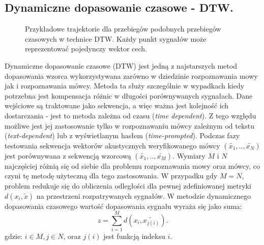 \subsection{Dynamiczne dopasowanie czasowe - DTW.}

\begin{figure}
  \centering
    
    \caption{Przykładowe trajektorie  dla przebiegów podobnych przebiegów czasowych w technice DTW. Każdy punkt sygnałów może reprezentować pojedynczy wektor cech.}
    \label{dtw}
\end{figure}

Dynamiczne dopasowanie czasowe (DTW) jest jedną z najstarszych metod dopasowania wzorca \cite{multidsp} wykorzystywana zarówno w dziedzinie rozpoznawania mowy jak i rozpoznawania mówcy. Metoda ta służy szczególnie w wypadkach kiedy potrzebna jest kompensacja różnic w długości porównywanych sygnałach. Dane wejściowe są traktowane jako sekwencja, a więc ważna jest kolejność ich dostarczania - jest to metoda zależna od czasu (\textit{time dependent}). Z tego względu możliwe jest jej zastosowanie tylko w rozpoznawaniu mówcy zależnym od tekstu (\textit{text-dependent}) lub z wyświetlanym hasłem (\textit{time-prompted}). Podczas fazy testowania sekwencja wektorów akustycznych weryfikowanego mówcy $(\tilde{x_1},..,\tilde{x_N})$ jest porównywana z sekwencją wzorcową $(\tilde{x_1},..,\tilde{x_M})$. Wymiary $M$ i $N$ najczęściej różnią się od siebie dla problemu rozpoznawania mowy oraz mówcy, co czyni tę metodę użyteczną dla tego zastosowania. W przypadku gdy $M=N$, problem redukuje się do obliczenia odległości dla pewnej zdefiniowanej metryki $d(x_i, \tilde{x})$ na przestrzeni rozpatrywanych sygnałów. W metodzie dynamicznego dopasowania czasowego wartość dopasowania sygnału wyraża się jako suma:
\begin{equation}
  z = \sum_{i=1}^{M} d(x_i,\tilde{x_{j(i)}}).
  \label{z}
\end{equation}
gdzie: $i \in M, j \in N$, oraz $j(i)$ jest funkcją indeksu $i$.

